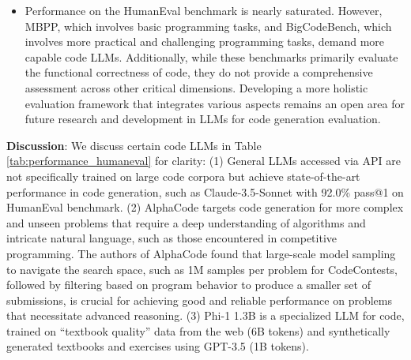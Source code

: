 \begin{itemize}
    \item Performance on the HumanEval benchmark is nearly saturated. However, MBPP, which involves basic programming tasks, and BigCodeBench, which involves more practical and challenging programming tasks, demand more capable code LLMs. Additionally, while these benchmarks primarily evaluate the functional correctness of code, they do not provide a comprehensive assessment across other critical dimensions. Developing a more holistic evaluation framework that integrates various aspects remains an open area for future research and development in LLMs for code generation evaluation.
\end{itemize}

\textbf{Discussion}:
We discuss certain code LLMs in Table \ref{tab:performance_humaneval} for clarity:
(1) General LLMs accessed via API are not specifically trained on large code corpora but achieve state-of-the-art performance in code generation, such as Claude-3.5-Sonnet with 92.0\% pass@1 on HumanEval benchmark.
(2) AlphaCode targets code generation for more complex and unseen problems that require a deep understanding of algorithms and intricate natural language, such as those encountered in competitive programming.
The authors of AlphaCode found that large-scale model sampling to navigate the search space, such as 1M samples per problem for CodeContests, followed by filtering based on program behavior to produce a smaller set of submissions, is crucial for achieving good and reliable performance on problems that necessitate advanced reasoning.
(3) Phi-1 1.3B is a specialized LLM for code, trained on ``textbook quality'' data from the web (6B tokens) and synthetically generated textbooks and exercises using GPT-3.5 (1B tokens).
